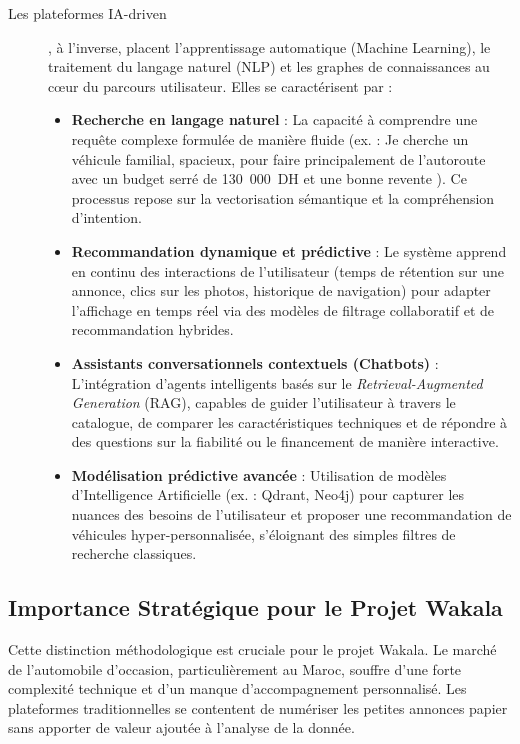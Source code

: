 \documentclass[11pt,a4paper]{article}
\begin{document}
\begin{description}
    \item[Les plateformes IA-driven], à l'inverse, placent l'apprentissage automatique (Machine Learning), le traitement du langage naturel (NLP) et les graphes de connaissances au c{\oe}ur du parcours utilisateur. Elles se caractérisent par :
    \begin{itemize}
        \item \textbf{Recherche en langage naturel} : La capacité à comprendre une requête complexe formulée de manière fluide (ex. : \og Je cherche un véhicule familial, spacieux, pour faire principalement de l'autoroute avec un budget serré de 130~000~DH et une bonne revente \fg). Ce processus repose sur la vectorisation sémantique et la compréhension d'intention.
        \item \textbf{Recommandation dynamique et prédictive} : Le système apprend en continu des interactions de l'utilisateur (temps de rétention sur une annonce, clics sur les photos, historique de navigation) pour adapter l'affichage en temps réel via des modèles de filtrage collaboratif et de recommandation hybrides.
        \item \textbf{Assistants conversationnels contextuels (Chatbots)} : L'intégration d'agents intelligents basés sur le \textit{Retrieval-Augmented Generation} (RAG), capables de guider l'utilisateur à travers le catalogue, de comparer les caractéristiques techniques et de répondre à des questions sur la fiabilité ou le financement de manière interactive.
        \item \textbf{Modélisation prédictive avancée} : Utilisation de modèles d'Intelligence Artificielle (ex. : Qdrant, Neo4j) pour capturer les nuances des besoins de l'utilisateur et proposer une recommandation de véhicules hyper-personnalisée, s'éloignant des simples filtres de recherche classiques.
    \end{itemize}
\end{description}

\subsection{Importance Stratégique pour le Projet Wakala}
Cette distinction méthodologique est cruciale pour le projet Wakala. Le marché de l'automobile d'occasion, particulièrement au Maroc, souffre d'une forte complexité technique et d'un manque d'accompagnement personnalisé. Les plateformes traditionnelles se contentent de numériser les petites annonces papier sans apporter de valeur ajoutée à l'analyse de la donnée. 
\end{document}
